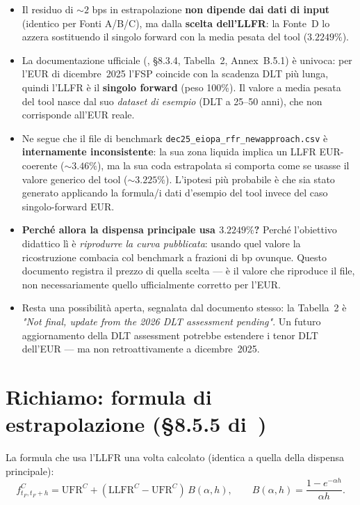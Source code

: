 \documentclass[11pt,a4paper]{article}
\theoremstyle{definition}
\theoremstyle{remark}
\newcommand{\UFR}{\mathrm{UFR}}
\newcommand{\LLFR}{\mathrm{LLFR}}
\begin{document}
\begin{itemize}
  \item Il residuo di $\sim 2$ bps in estrapolazione \textbf{non dipende dai dati di input}
        (identico per Fonti A/B/C), ma dalla \textbf{scelta dell'LLFR}: la Fonte~D lo azzera
        sostituendo il singolo forward con la media pesata del tool ($3.2249\%$).
  \item La documentazione ufficiale (\cite{eiopa2026}, §8.3.4, Tabella~2, Annex~B.5.1) \`e
        univoca: per l'EUR di dicembre~2025 l'FSP coincide con la scadenza DLT pi\`u lunga,
        quindi l'LLFR \`e il \textbf{singolo forward} (peso 100\%). Il valore a media pesata
        del tool nasce dal suo \emph{dataset di esempio} (DLT a 25--50 anni), che non
        corrisponde all'EUR reale.
  \item Ne segue che il file di benchmark \texttt{dec25\_eiopa\_rfr\_newapproach.csv} \`e
        \textbf{internamente inconsistente}: la sua zona liquida implica un LLFR EUR-coerente
        ($\sim3.46\%$), ma la sua coda estrapolata si comporta come se usasse il valore
        generico del tool ($\sim3.225\%$). L'ipotesi pi\`u probabile \`e che sia stato generato
        applicando la formula/i dati d'esempio del tool invece del caso singolo-forward EUR.
  \item \textbf{Perch\'e allora la dispensa principale usa $3.2249\%$?} Perch\'e l'obiettivo
        didattico l\`i \`e \emph{riprodurre la curva pubblicata}: usando quel valore la
        ricostruzione combacia col benchmark a frazioni di bp ovunque. Questo documento
        registra il prezzo di quella scelta --- \`e il valore che riproduce il file, non
        necessariamente quello ufficialmente corretto per l'EUR.
  \item Resta una possibilit\`a aperta, segnalata dal documento stesso: la Tabella~2 \`e
        \emph{"Not final, update from the 2026 DLT assessment pending"}. Un futuro
        aggiornamento della DLT assessment potrebbe estendere i tenor DLT dell'EUR --- ma non
        retroattivamente a dicembre~2025.
\end{itemize}

\appendix
\section*{Richiamo: formula di estrapolazione (§8.5.5 di~\cite{eiopa2026})}
La formula che usa l'LLFR una volta calcolato (identica a quella della dispensa principale):
\begin{equation}
  f^C_{t_F,t_F+h} = \UFR^C + (\LLFR^C-\UFR^C)\,B(\alpha,h),
  \qquad B(\alpha,h)=\frac{1-e^{-\alpha h}}{\alpha h}.
  \label{eq:extrap-fwd-app}
\end{equation}
\end{document}

